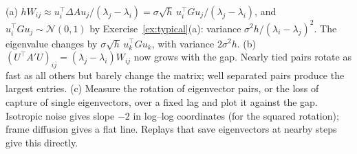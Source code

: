 (a) $hW_{ij}\approx u_i^\top\Delta Au_j/(\lambda_j-\lambda_i)=\sigma\sqrt h\,u_i^\top Gu_j/(\lambda_j-\lambda_i)$, and
$u_i^\top Gu_j\sim\mathcal{N}(0,1)$ by Exercise~\ref{ex:typical}(a): variance $\sigma^2h/(\lambda_i-\lambda_j)^2$. The
eigenvalue changes by $\sigma\sqrt h\,u_k^\top Gu_k$, with variance $2\sigma^2h$.
\newline (b) $(U^\top A'U)_{ij}=(\lambda_j-\lambda_i)W_{ij}$ now grows with the gap. Nearly tied pairs rotate as fast as all
others but barely change the matrix; well separated pairs produce the largest entries.
\newline (c) Measure the rotation of eigenvector pairs, or the loss of capture of single eigenvectors, over a fixed lag and plot
it against the gap. Isotropic noise gives slope $-2$ in log--log coordinates (for the squared rotation); frame
diffusion gives a flat line. Replays that save eigenvectors at nearby steps give this directly.
